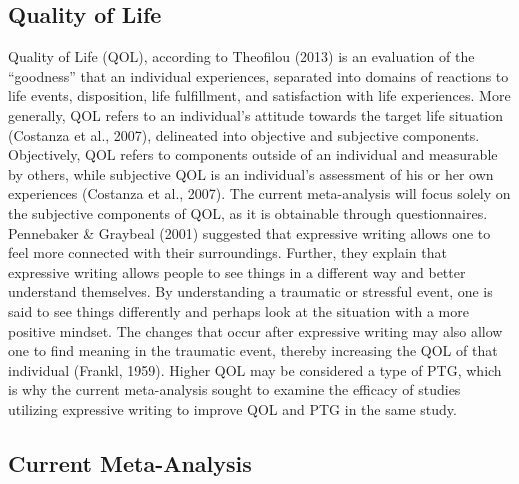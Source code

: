 \documentclass[man, mask]{apa6}
\theoremstyle{definition}
\theoremstyle{definition}
\theoremstyle{definition}
\theoremstyle{remark}
\begin{document}
\subsection{Quality of Life}\label{quality-of-life}

Quality of Life (QOL), according to Theofilou (2013) is an evaluation of
the \enquote{goodness} that an individual experiences, separated into
domains of reactions to life events, disposition, life fulfillment, and
satisfaction with life experiences. More generally, QOL refers to an
individual's attitude towards the target life situation (Costanza et
al., 2007), delineated into objective and subjective components.
Objectively, QOL refers to components outside of an individual and
measurable by others, while subjective QOL is an individual's assessment
of his or her own experiences (Costanza et al., 2007). The current
meta-analysis will focus solely on the subjective components of QOL, as
it is obtainable through questionnaires. Pennebaker \& Graybeal (2001)
suggested that expressive writing allows one to feel more connected with
their surroundings. Further, they explain that expressive writing allows
people to see things in a different way and better understand
themselves. By understanding a traumatic or stressful event, one is said
to see things differently and perhaps look at the situation with a more
positive mindset. The changes that occur after expressive writing may
also allow one to find meaning in the traumatic event, thereby
increasing the QOL of that individual (Frankl, 1959). Higher QOL may be
considered a type of PTG, which is why the current meta-analysis sought
to examine the efficacy of studies utilizing expressive writing to
improve QOL and PTG in the same study.

\subsection{Current Meta-Analysis}\label{current-meta-analysis}
\end{document}
